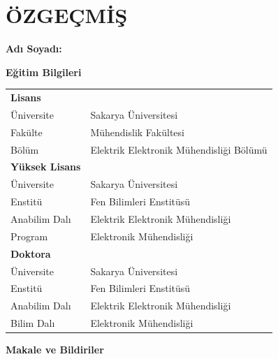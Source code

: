 \chapter{ÖZGEÇMİŞ}
\begingroup
\singlespacing


\textbf{Adı Soyadı:} \TezYazari

\bigskip
\textbf{Eğitim Bilgileri}

\smallskip
\begin{tabular}{@{}ll@{}}
  \textbf{Lisans} & \\
  Üniversite & Sakarya Üniversitesi \\
  Fakülte & Mühendislik Fakültesi \\
  Bölüm & Elektrik Elektronik Mühendisliği Bölümü \\[4pt]
  \textbf{Yüksek Lisans} & \\
  Üniversite & Sakarya Üniversitesi \\
  Enstitü & Fen Bilimleri Enstitüsü \\
  Anabilim Dalı & Elektrik Elektronik Mühendisliği \\
  Program & Elektronik Mühendisliği \\[4pt]
  \textbf{Doktora} & \\
  Üniversite & Sakarya Üniversitesi \\
  Enstitü & Fen Bilimleri Enstitüsü \\
  Anabilim Dalı & Elektrik Elektronik Mühendisliği \\
  Bilim Dalı & Elektronik Mühendisliği \\
\end{tabular}

\bigskip
\textbf{Makale ve Bildiriler}

